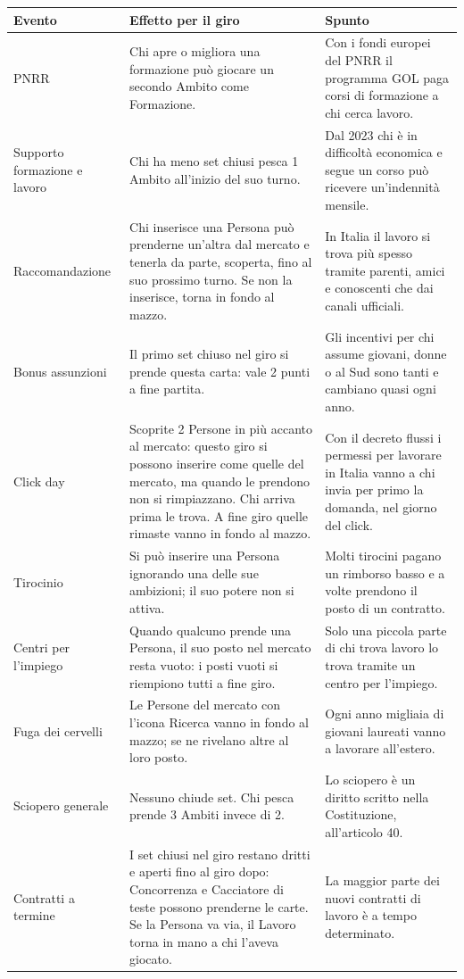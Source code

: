 \documentclass[11pt,a4paper]{article}
\begin{document}
{\small
\begin{xltabular}{\textwidth}{@{}P{2.9cm}LL@{}}
\toprule
Evento & Effetto per il giro & Spunto \\
\midrule
\endhead
PNRR & Chi apre o migliora una formazione può giocare un secondo Ambito come Formazione. & Con i fondi europei del PNRR il programma GOL paga corsi di formazione a chi cerca lavoro. \\
Supporto formazione e lavoro & Chi ha meno set chiusi pesca 1 Ambito all'inizio del suo turno. & Dal 2023 chi è in difficoltà economica e segue un corso può ricevere un'indennità mensile. \\
Raccomandazione & Chi inserisce una Persona può prenderne un'altra dal mercato e tenerla da parte, scoperta, fino al suo prossimo turno. Se non la inserisce, torna in fondo al mazzo. & In Italia il lavoro si trova più spesso tramite parenti, amici e conoscenti che dai canali ufficiali. \\
Bonus assunzioni & Il primo set chiuso nel giro si prende questa carta: vale 2 punti a fine partita. & Gli incentivi per chi assume giovani, donne o al Sud sono tanti e cambiano quasi ogni anno. \\
Click day & Scoprite 2 Persone in più accanto al mercato: questo giro si possono inserire come quelle del mercato, ma quando le prendono non si rimpiazzano. Chi arriva prima le trova. A fine giro quelle rimaste vanno in fondo al mazzo. & Con il decreto flussi i permessi per lavorare in Italia vanno a chi invia per primo la domanda, nel giorno del click. \\
Tirocinio & Si può inserire una Persona ignorando una delle sue ambizioni; il suo potere non si attiva. & Molti tirocini pagano un rimborso basso e a volte prendono il posto di un contratto. \\
Centri per l'impiego & Quando qualcuno prende una Persona, il suo posto nel mercato resta vuoto: i posti vuoti si riempiono tutti a fine giro. & Solo una piccola parte di chi trova lavoro lo trova tramite un centro per l'impiego. \\
Fuga dei cervelli & Le Persone del mercato con l'icona Ricerca vanno in fondo al mazzo; se ne rivelano altre al loro posto. & Ogni anno migliaia di giovani laureati vanno a lavorare all'estero. \\
Sciopero generale & Nessuno chiude set. Chi pesca prende 3 Ambiti invece di 2. & Lo sciopero è un diritto scritto nella Costituzione, all'articolo 40. \\
Contratti a termine & I set chiusi nel giro restano dritti e aperti fino al giro dopo: Concorrenza e Cacciatore di teste possono prenderne le carte. Se la Persona va via, il Lavoro torna in mano a chi l'aveva giocato. & La maggior parte dei nuovi contratti di lavoro è a tempo determinato. \\

\end{xltabular}}
\end{document}
